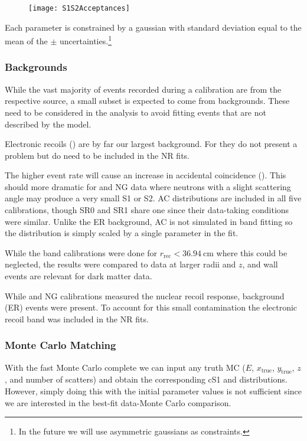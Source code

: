 \begin{figure}
\centering
\texttt{[image: S1S2Acceptances]}
\label{fig:er_nr_calibrations_parameter_determ_cuts_acceptances}
\end{figure}

Each parameter is
constrained by a gaussian with standard deviation equal to the mean of the $\pm$ uncertainties.\footnote{In the future we will use
asymmetric gaussians as constraints.}



\subsubsection{Backgrounds}
\label{subsubsec:er_nr_calibrations_parameter_determ_additional_components}
While the vast majority of events recorded during a calibration are from the respective source, a small subset is expected to come
from backgrounds.  These need to be considered in the analysis to avoid fitting events that are not described by the model.

Electronic recoils () are by far our largest background.  For 
they do not present a problem but do need to be included in the NR fits.

The higher event rate will cause an increase in accidental coincidence ().  This should more dramatic
for \ambe and NG data where neutrons with a slight scattering angle may produce a very small S1 or S2.  AC distributions are included
in all five calibrations, though SR0 and SR1 \ambe share one since their data-taking conditions were similar.  Unlike the ER background,
AC is not simulated in band fitting so the distribution is simply scaled by a single parameter in the fit.

While the band calibrations were
done for $r_{\mathrm{rec}} < 36.94\ \mathrm{cm}$ where this could be neglected, the results were compared to data at larger radii and $z$,
and wall events are relevant for dark matter data.

While \ambe and NG calibrations measured the nuclear recoil response, background (ER) events were present.  To account for this small
contamination the electronic recoil band was included in the NR fits.



\subsubsection{Monte Carlo Matching}
\label{subsubsec:er_nr_calibrations_parameter_determ_mc_match}
With the fast Monte Carlo complete we can input any truth MC ($E$, $x_{\mathrm{true}}$, $y_{\mathrm{true}}$,
$z$, and number of scatters) and obtain the corresponding cS1 and \cstwob distributions.  However, simply doing this with
the initial parameter values is not sufficient since we are interested in the best-fit data-Monte Carlo comparison.

